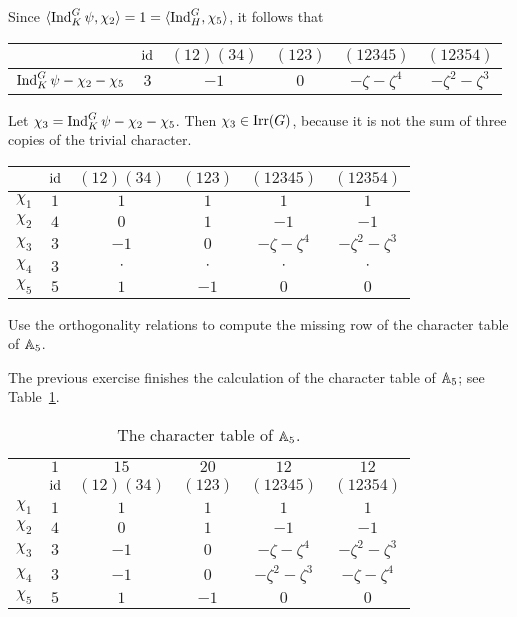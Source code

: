Since 
$\langle\operatorname{Ind}_K^G\psi,\chi_2\rangle=1=\langle\operatorname{Ind}_H^G,\chi_5\rangle$,
it follows that 
\bigskip 
\begin{center}
        \begin{tabular}{|c|ccccc|}
        \hline  
         & $\operatorname{id}$ & $(12)(34)$ & $(123)$ & $(12345)$ & $(12354)$\\
         \hline 
         $\operatorname{Ind}_K^G\psi-\chi_2-\chi_5$ & $3$ & $-1$ & $0$ & $-\zeta-\zeta^4$ & $-\zeta^2-\zeta^3$\\
         \hline 
\end{tabular}
\end{center}
\bigskip 
Let $\chi_3=\operatorname{Ind}_K^G\psi-\chi_2-\chi_5$. Then $\chi_3\in\operatorname{Irr}(G)$, because it is
not the sum of three copies of the trivial character. 
\bigskip
\begin{center}
        \begin{tabular}{|c|ccccc|}
        \hline  
         & $\operatorname{id}$ & $(12)(34)$ & $(123)$ & $(12345)$ & $(12354)$\\
        \hline 
        $\chi_1$ & $1$ & $1$ & $1$ & $1$ & $1$\\
        $\chi_2$ & $4$ & $0$ & $1$ & $-1$ & $-1$\\
        $\chi_3$ & $3$ & $-1$ & $0$ & $-\zeta-\zeta^4$ & $-\zeta^2-\zeta^3$\\
        $\chi_4$ & $3$ & $\cdot$ & $\cdot$ & $\cdot$& $\cdot$\\
        $\chi_5$ & $5$ & $1$ & $-1$ & $0$& $0$\\
        \hline 
    \end{tabular}
\end{center}
\bigskip 

\begin{exercise}
    Use the orthogonality relations
    to compute the missing row of the character table
    of $\mathbb{A}_5$. 
\end{exercise}

The previous exercise finishes the calculation
of the character table of $\mathbb{A}_5$; see Table~\ref{tab:A5}. 


\begin{table}[h]
\caption{The character table of $\mathbb{A}_5$.}
\label{tab:A5}
        \begin{tabular}{|c|ccccc|}
        \hline  
        & $1$ & $15$ & $20$ & $12$ & $12$ \\
         & $\operatorname{id}$ & $(12)(34)$ & $(123)$ & $(12345)$ & $(12354)$\\
        \hline 
        $\chi_1$ & $1$ & $1$ & $1$ & $1$ & $1$\\
        $\chi_2$ & $4$ & $0$ & $1$ & $-1$ & $-1$\\
        $\chi_3$ & $3$ & $-1$ & $0$ & $-\zeta-\zeta^4$ & $-\zeta^2-\zeta^3$\\
        $\chi_4$ & $3$ &  $-1$ & $0$ & $-\zeta^2-\zeta^3$ & $-\zeta-\zeta^4$ \\
        $\chi_5$ & $5$ & $1$ & $-1$ & $0$& $0$\\
        \hline 
    \end{tabular}
\end{table}

